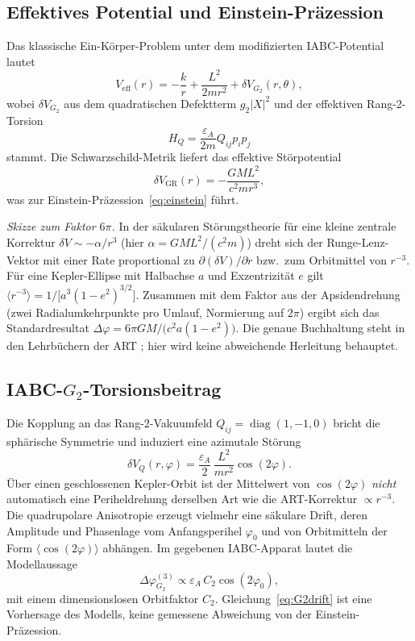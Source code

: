 \documentclass[11pt,a4paper]{article}
\theoremstyle{definition}
\theoremstyle{remark}
\begin{document}
\subsection{Effektives Potential und Einstein-Präzession}

Das klassische Ein-Körper-Problem unter dem modifizierten IABC-Potential lautet
\begin{equation}
  V_{\mathrm{eff}}(r)=-\frac{k}{r}+\frac{L^2}{2m r^2}+\delta V_{G_2}(r,\theta),
\end{equation}
wobei \(\delta V_{G_2}\) aus dem quadratischen Defektterm \(g_2|X|^2\) und der effektiven
Rang-2-Torsion
\begin{equation}
  H_Q=\frac{\varepsilon_A}{2m}Q_{ij}p_i p_j
\end{equation}
stammt. Die Schwarzschild-Metrik liefert das effektive Störpotential
\begin{equation}
  \delta V_{\mathrm{GR}}(r)=-\frac{GM L^2}{c^2 m r^3},
\end{equation}
was zur Einstein-Präzession~\eqref{eq:einstein} führt.

\emph{Skizze zum Faktor \(6\pi\).}
 In der säkularen Störungstheorie für eine kleine zentrale
Korrektur \(\delta V\sim -\alpha/r^3\) (hier \(\alpha=GM L^2/(c^2 m)\)) dreht sich der
Runge-Lenz-Vektor mit einer Rate proportional zu \(\partial(\delta V)/\partial r\) bzw.\ zum
Orbitmittel von \(r^{-3}\). Für eine Kepler-Ellipse mit Halbachse \(a\) und Exzentrizität
\(e\) gilt \(\langle r^{-3}\rangle=1/\bigl[a^3(1-e^2)^{3/2}\bigr]\). Zusammen mit dem
Faktor aus der Apsidendrehung (zwei Radialumkehrpunkte pro Umlauf, Normierung auf \(2\pi\))
ergibt sich das Standardresultat \(\Delta\varphi=6\pi GM/\bigl(c^2 a(1-e^2)\bigr)\). Die
genaue Buchhaltung steht in den Lehrbüchern der ART \cite{Weinberg1972,MTW1973}; hier wird
keine abweichende Herleitung behauptet.

\subsection{IABC-\texorpdfstring{\(G_2\)}{G2}-Torsionsbeitrag}

Die Kopplung an das Rang-2-Vakuumfeld \(Q_{ij}=\operatorname{diag}(1,-1,0)\) bricht die
sphärische Symmetrie und induziert eine azimutale Störung
\begin{equation}
  \delta V_Q(r,\varphi)=\frac{\varepsilon_A}{2}\,\frac{L^2}{m r^2}\cos(2\varphi).
\end{equation}
Über einen geschlossenen Kepler-Orbit ist der Mittelwert von \(\cos(2\varphi)\)
\emph{nicht} automatisch eine Periheldrehung derselben Art wie die ART-Korrektur
\(\propto r^{-3}\). Die quadrupolare Anisotropie erzeugt vielmehr eine säkulare Drift, deren
Amplitude und Phasenlage vom Anfangsperihel \(\varphi_0\) und von Orbitmitteln der Form
\(\langle\cos(2\varphi)\rangle\) abhängen. Im gegebenen IABC-Apparat lautet die
Modellaussage
\begin{equation}
  \Delta\varphi_{G_2}^{(3)}\propto\varepsilon_A\,C_2\cos(2\varphi_0),
  \label{eq:G2drift}
\end{equation}
mit einem dimensionslosen Orbitfaktor \(C_2\). Gleichung~\eqref{eq:G2drift} ist eine
Vorhersage des Modells, keine gemessene Abweichung von der Einstein-Präzession.
\end{document}
